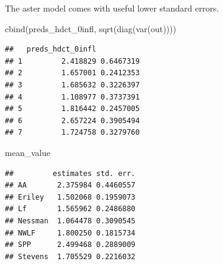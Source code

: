 \documentclass[
  ignorenonframetext,
]{beamer}
\newenvironment{Shaded}{\begin{snugshade}}{\end{snugshade}}
\newcommand{\FunctionTok}[1]{\textcolor[rgb]{0.00,0.00,0.00}{#1}}
\newcommand{\NormalTok}[1]{#1}
\begin{document}
\begin{frame}[fragile]{}
\protect\hypertarget{section-45}{}
The aster model comes with useful lower standard errors.

\vspace{12pt}
\tiny

\begin{Shaded}
\begin{Highlighting}[]
\FunctionTok{cbind}\NormalTok{(preds\_hdct\_0infl, }\FunctionTok{sqrt}\NormalTok{(}\FunctionTok{diag}\NormalTok{(}\FunctionTok{var}\NormalTok{(out))))}
\end{Highlighting}
\end{Shaded}

\begin{verbatim}
##   preds_hdct_0infl          
## 1         2.418829 0.6467319
## 2         1.657001 0.2412353
## 3         1.685632 0.3226397
## 4         1.108977 0.3737391
## 5         1.816442 0.2457005
## 6         2.657224 0.3905494
## 7         1.724758 0.3279760
\end{verbatim}

\begin{Shaded}
\begin{Highlighting}[]
\NormalTok{mean\_value}
\end{Highlighting}
\end{Shaded}

\begin{verbatim}
##         estimates std. err.
## AA       2.375984 0.4460557
## Eriley   1.502068 0.1959073
## Lf       1.565962 0.2486880
## Nessman  1.064478 0.3090545
## NWLF     1.800250 0.1815734
## SPP      2.499468 0.2889009
## Stevens  1.705529 0.2216032
\end{verbatim}
\end{frame}
\end{document}

